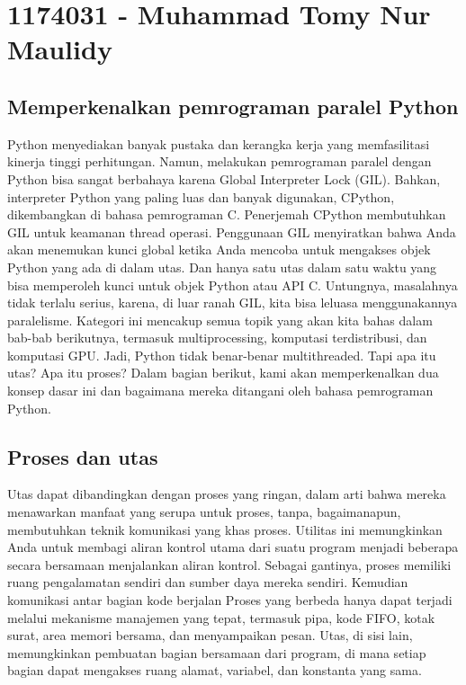\section{1174031 - Muhammad Tomy Nur Maulidy}
\subsection{Memperkenalkan pemrograman paralel Python}
	Python menyediakan banyak pustaka dan kerangka kerja yang memfasilitasi kinerja tinggi
perhitungan. Namun, melakukan pemrograman paralel dengan Python bisa sangat berbahaya
karena Global Interpreter Lock (GIL).
Bahkan, interpreter Python yang paling luas dan banyak digunakan, CPython, dikembangkan di
bahasa pemrograman C. Penerjemah CPython membutuhkan GIL untuk keamanan thread
operasi. Penggunaan GIL menyiratkan bahwa Anda akan menemukan kunci global ketika Anda mencoba
untuk mengakses objek Python yang ada di dalam utas. Dan hanya satu utas dalam satu waktu yang bisa
memperoleh kunci untuk objek Python atau API C.
Untungnya, masalahnya tidak terlalu serius, karena, di luar ranah GIL, kita bisa leluasa menggunakannya
paralelisme. Kategori ini mencakup semua topik yang akan kita bahas dalam bab-bab berikutnya,
termasuk multiprocessing, komputasi terdistribusi, dan komputasi GPU.
Jadi, Python tidak benar-benar multithreaded. Tapi apa itu utas? Apa itu proses? Dalam
bagian berikut, kami akan memperkenalkan dua konsep dasar ini dan bagaimana mereka
ditangani oleh bahasa pemrograman Python.
\subsection{Proses dan utas}
Utas dapat dibandingkan dengan proses yang ringan, dalam arti bahwa mereka menawarkan manfaat yang serupa untuk proses, tanpa, bagaimanapun, membutuhkan teknik komunikasi yang khas proses. Utilitas ini memungkinkan Anda untuk membagi aliran kontrol utama dari suatu program menjadi beberapa secara bersamaan menjalankan aliran kontrol. Sebagai gantinya, proses memiliki ruang pengalamatan sendiri dan sumber daya mereka sendiri. Kemudian komunikasi antar bagian kode berjalan Proses yang berbeda hanya dapat terjadi melalui mekanisme manajemen yang tepat, termasuk pipa, kode FIFO, kotak surat, area memori bersama, dan menyampaikan pesan. Utas, di sisi lain, memungkinkan pembuatan bagian bersamaan dari program, di mana setiap bagian dapat mengakses ruang alamat, variabel, dan konstanta yang sama.

